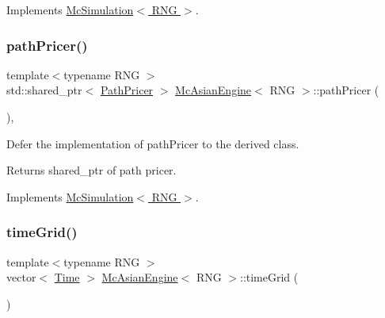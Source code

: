 Implements \hyperlink{class_mc_simulation_a44086a1efd452d8644c9f2e52417038f}{Mc\+Simulation$<$ R\+N\+G $>$}.

\hypertarget{class_mc_asian_engine_a5b7351c28b68878b7f6d130eef293d6c}{}\label{class_mc_asian_engine_a5b7351c28b68878b7f6d130eef293d6c} 
\subsubsection{\texorpdfstring{path\+Pricer()}{pathPricer()}}
{\footnotesize\ttfamily template$<$typename R\+NG $>$ \\
std\+::shared\+\_\+ptr$<$ \hyperlink{class_path_pricer}{Path\+Pricer} $>$ \hyperlink{class_mc_asian_engine}{Mc\+Asian\+Engine}$<$ R\+NG $>$\+::path\+Pricer (\begin{DoxyParamCaption}{ }\end{DoxyParamCaption})\hspace{0.3cm}{\ttfamily [override]}, {\ttfamily [virtual]}}



Defer the implementation of path\+Pricer to the derived class. 

\begin{DoxyReturn}{Returns}
shared\+\_\+ptr of path pricer. 
\end{DoxyReturn}


Implements \hyperlink{class_mc_simulation_ae3b894a78823df7897abf418bb04a4a1}{Mc\+Simulation$<$ R\+N\+G $>$}.

\hypertarget{class_mc_asian_engine_ad8d2c8721172ab1d7327db91a26c5052}{}\label{class_mc_asian_engine_ad8d2c8721172ab1d7327db91a26c5052} 
\subsubsection{\texorpdfstring{time\+Grid()}{timeGrid()}}
{\footnotesize\ttfamily template$<$typename R\+NG $>$ \\
vector$<$ \hyperlink{_name_def_8h_ac2d3e0ba793497bcca555c7c2cf64ff3}{Time} $>$ \hyperlink{class_mc_asian_engine}{Mc\+Asian\+Engine}$<$ R\+NG $>$\+::time\+Grid (\begin{DoxyParamCaption}{ }\end{DoxyParamCaption})\hspace{0.3cm}{\ttfamily [override]}}



